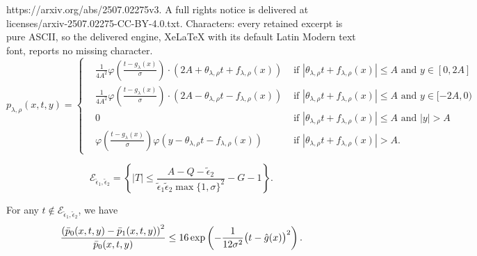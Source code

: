 \documentclass[10pt,a4paper]{amsart}
\def\eps{{\epsilon}}
\def\gE{{\mathcal{E}}}
\begin{document}
https://arxiv.org/abs/2507.02275v3. A full rights notice is delivered at licenses/arxiv-2507.02275-CC-BY-4.0.txt. Characters: every retained excerpt is pure ASCII, so the delivered engine, XeLaTeX with its default Latin Modern text font, reports no missing character.
\begin{equation}
    \label{eq:lambda-joint-density}
    p_{\lambda,\rho}(x,t,y) = \left\{ 
    \begin{aligned}
        & \frac{1}{4A^2}\varphi\left(\frac{t-g_{\lambda}(x)}{\sigma}\right)\cdot \left( 2A+\theta_{\lambda,\rho}t+f_{\lambda,\rho}(x)\right) &\text{ if } \left|\theta_{\lambda,\rho}t+f_{\lambda,\rho}(x)\right| \leq A \text{ and } y\in[0,2A] \\
        & \frac{1}{4A^2}\varphi\left(\frac{t-g_{\lambda}(x)}{\sigma}\right)\cdot \left( 2A-\theta_{\lambda,\rho}t-f_{\lambda,\rho}(x)\right) &\text{ if } \left|\theta_{\lambda,\rho}t+f_{\lambda,\rho}(x)\right| \leq A \text{ and } y \in[-2A,0) \\
        & 0 &\text{ if } \left|\theta_{\lambda,\rho}t+f_{\lambda,\rho}(x)\right| \leq A \text{ and } |y| > A \\
        & \varphi\left(\frac{t-g_{\lambda}(x)}{\sigma}\right)\varphi\left(y-\theta_{\lambda,\rho}t-f_{\lambda,\rho}(x)\right) &\text{ if } \left|\theta_{\lambda,\rho}t+f_{\lambda,\rho}(x)\right|>A.
    \end{aligned}
    \right.
\end{equation}

\begin{equation}
    \label{eq:def-good-event}
    \gE_{\tilde{\eps}_1,\tilde{\eps}_2} = \left\{ |T| \leq \frac{A-Q-\tilde{\eps}_2}{\tilde{\eps}_1\tilde{\eps}_2\max\{1,\sigma\}^2} - G -1\right\}.
\end{equation}

\begin{lemma}
\label{lemma:chi-square-bad}
    For any $t\notin\gE_{\tilde{\eps}_1,\tilde{\eps}_2}$, we have
    \begin{equation}
        \notag
        \frac{\left(\bar{p}_0(x,t,y)-\bar{p}_1(x,t,y)\right)^2}{\bar{p}_0(x,t,y)} \leq 16\exp\left(-\frac{1}{12\sigma^2}\big(t-\hat{g}(x)\big)^2\right).
    \end{equation}
\end{lemma}
\end{document}
